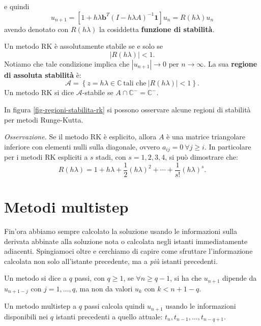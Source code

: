 e quindi
\begin{equation*}
u_{n+1} =\left[ 1+h\lambda \mathbf{b}^{T}( I-h\lambda A)^{-1}\mathbf{1}\right] u_{n} =R( h\lambda ) u_{n}
\end{equation*}
avendo denotato con $R( h\lambda )$ la cosiddetta \textbf{funzione di stabilità}.
\begin{definition}
Un metodo RK è assolutamente stabile se e solo se
$$| R( h\lambda )| < 1.$$
Notiamo che tale condizione implica che $|u_{n+1} |\to 0$ per $n\to\infty$. La sua \textbf{regione di assoluta stabilità} è:
$$\mathcal{A} =\left\{z=h\lambda \in \mathbb{C} \ \text{tali che} \ | R( h\lambda )| < 1\right\}.$$
Un metodo RK si dice $\mathcal{A}$-stabile se $A\cap \mathbb{C}^{-} =\mathbb{C}^{-}$.
\end{definition}
In figura \ref{fig-regioni-stabilita-rk} si possono osservare alcune regioni di stabilità per metodi Runge-Kutta.

\textit{Osservazione.}
Se il metodo RK è esplicito, allora $A$ è una matrice triangolare inferiore con elementi nulli sulla diagonale, ovvero $a_{ij} =0 \ \forall j\geqslant i$. In particolare per i metodi RK espliciti a $s$ stadi, con $s=1,2,3,4$, si può dimostrare che:
\begin{equation*}
R( h\lambda ) =1+h\lambda +\frac{1}{2}( h\lambda )^{2} +\cdots +\frac{1}{s!}( h\lambda )^{s}.
\end{equation*}


\section{Metodi multistep}
\label{sec:metodi-multistep}
Fin'ora abbiamo sempre calcolato la soluzione usando le informazioni sulla derivata abbinate alla soluzione nota o calcolata negli istanti immediatamente adiacenti. Spingiamoci oltre e cerchiamo di capire come sfruttare l'informazione calcolata non solo all'istante precedente, ma a \textit{più} istanti precedenti.
\begin{definition}
Un metodo si dice a $q$ passi, con $q\geqslant 1$, se $\forall n\geqslant q-1$, si ha che $u_{n+1}$ dipende da $u_{n+1-j}$ con $j=1,\ldots,q$, ma non da valori $u_{k}$ con $k< n+1-q$.
\end{definition}
Un metodo multistep a $q$ passi calcola quindi $u_{n+1}$ usando le informazioni disponibili nei $q$ istanti precedenti a quello attuale: $t_{n} ,t_{n-1} ,\dotsc, t_{n-q+1}$.

